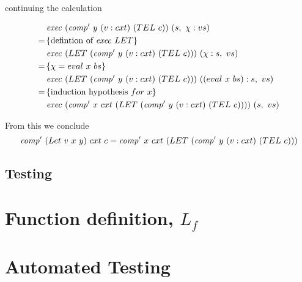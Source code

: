 \documentclass {article}
\begin{document}
continuing the calculation

\begin{align*}
&\Exec (\Compp  y\ (v:cxt)\ (TEL\ c))\ (s,\ \chi : vs) \\
=\, & \{\mbox{defintion of}\ \Exec LET\} \\
&\Exec (LET\ (\Compp  y\ (v:cxt)\ (TEL\ c)))\ (\chi : s,\ vs)\\
=\, & \{ \chi = eval\ x\ bs \} \\
&\Exec (LET\ (\Compp  y\ (v:cxt)\ (TEL\ c)))\ ((eval\ x\ bs) : s,\ vs)\\
=\, & \{ \mbox{induction hypothesis}\ for\ x \} \\
&\Exec (\Compp  x\ cxt\ (LET\ (\Compp  y\ (v:cxt)\ (TEL\ c))))\ (s,\ vs)
\end{align*}

From this we conclude
\[ \Compp  (Let\ v\ x\ y)\ cxt\ c
		= \Compp  x\ cxt\ (LET\ (\Compp  y\ (v:cxt)\ (TEL\ c))) \]

\subsection{Testing}

\section{Function definition, $L_f$} \label{langfunc}

\section{Automated Testing} \label{autotesting}










\end{document}
